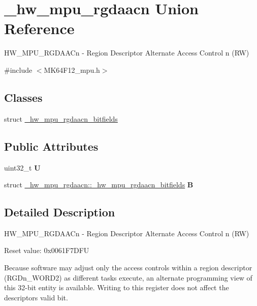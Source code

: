 \hypertarget{union__hw__mpu__rgdaacn}{}\section{\+\_\+hw\+\_\+mpu\+\_\+rgdaacn Union Reference}
\label{union__hw__mpu__rgdaacn}


H\+W\+\_\+\+M\+P\+U\+\_\+\+R\+G\+D\+A\+A\+Cn -\/ Region Descriptor Alternate Access Control n (RW)  




{\ttfamily \#include $<$M\+K64\+F12\+\_\+mpu.\+h$>$}

\subsection*{Classes}
\begin{DoxyCompactItemize}
\item 
struct \hyperlink{struct__hw__mpu__rgdaacn_1_1__hw__mpu__rgdaacn__bitfields}{\+\_\+hw\+\_\+mpu\+\_\+rgdaacn\+\_\+bitfields}
\end{DoxyCompactItemize}
\subsection*{Public Attributes}
\begin{DoxyCompactItemize}
\item 
uint32\+\_\+t {\bfseries U}\hypertarget{union__hw__mpu__rgdaacn_a8288dda3525777f1ec0ccced079dbe3e}{}\label{union__hw__mpu__rgdaacn_a8288dda3525777f1ec0ccced079dbe3e}

\item 
struct \hyperlink{struct__hw__mpu__rgdaacn_1_1__hw__mpu__rgdaacn__bitfields}{\+\_\+hw\+\_\+mpu\+\_\+rgdaacn\+::\+\_\+hw\+\_\+mpu\+\_\+rgdaacn\+\_\+bitfields} {\bfseries B}\hypertarget{union__hw__mpu__rgdaacn_a90a7622d7b5f2df9afc855b7e5ee123e}{}\label{union__hw__mpu__rgdaacn_a90a7622d7b5f2df9afc855b7e5ee123e}

\end{DoxyCompactItemize}


\subsection{Detailed Description}
H\+W\+\_\+\+M\+P\+U\+\_\+\+R\+G\+D\+A\+A\+Cn -\/ Region Descriptor Alternate Access Control n (RW) 

Reset value\+: 0x0061\+F7\+D\+FU

Because software may adjust only the access controls within a region descriptor (R\+G\+Dn\+\_\+\+W\+O\+R\+D2) as different tasks execute, an alternate programming view of this 32-\/bit entity is available. Writing to this register does not affect the descriptor\textquotesingle{}s valid bit. 

